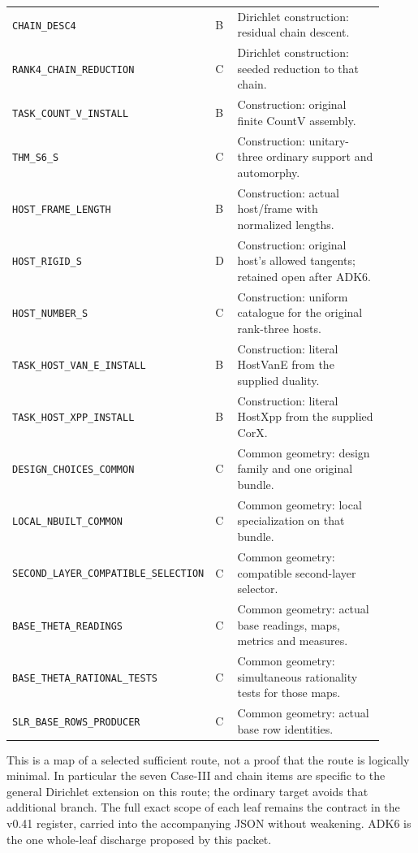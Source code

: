 \begin{longtable}{p{0.44\linewidth}p{0.06\linewidth}p{0.41\linewidth}}
\texttt{CHAIN\_DESC4} & B & Dirichlet construction: residual chain descent.\\
\texttt{RANK4\_CHAIN\_REDUCTION} & C & Dirichlet construction: seeded reduction to that chain.\\
\texttt{TASK\_COUNT\_V\_INSTALL} & B & Construction: original finite CountV assembly.\\
\texttt{THM\_S6\_S} & C & Construction: unitary-three ordinary support and automorphy.\\
\texttt{HOST\_FRAME\_LENGTH} & B & Construction: actual host/frame with normalized lengths.\\
\texttt{HOST\_RIGID\_S} & D & Construction: original host's allowed tangents; retained open after ADK6.\\
\texttt{HOST\_NUMBER\_S} & C & Construction: uniform catalogue for the original rank-three hosts.\\
\texttt{TASK\_HOST\_VAN\_E\_INSTALL} & B & Construction: literal HostVanE from the supplied duality.\\
\texttt{TASK\_HOST\_XPP\_INSTALL} & B & Construction: literal HostXpp from the supplied CorX.\\
\texttt{DESIGN\_CHOICES\_COMMON} & C & Common geometry: design family and one original bundle.\\
\texttt{LOCAL\_NBUILT\_COMMON} & C & Common geometry: local specialization on that bundle.\\
\texttt{SECOND\_LAYER\_COMPATIBLE\_SELECTION} & C & Common geometry: compatible second-layer selector.\\
\texttt{BASE\_THETA\_READINGS} & C & Common geometry: actual base readings, maps, metrics and measures.\\
\texttt{BASE\_THETA\_RATIONAL\_TESTS} & C & Common geometry: simultaneous rationality tests for those maps.\\
\texttt{SLR\_BASE\_ROWS\_PRODUCER} & C & Common geometry: actual base row identities.\\
\end{longtable}

This is a map of a selected sufficient route, not a proof that the
route is logically minimal.  In particular the seven Case-III and
chain items are specific to the general Dirichlet extension on this
route; the ordinary target avoids that additional branch.  The
full exact scope of each leaf remains the contract in the v0.41
register, carried into the accompanying JSON without weakening.
ADK6 is the one whole-leaf discharge proposed by this packet.

